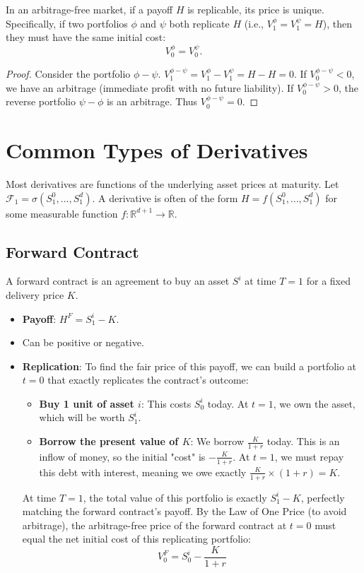 \begin{proposition}
In an arbitrage-free market, if a payoff $H$ is replicable, its price is unique. Specifically, if two portfolios $\phi$ and $\psi$ both replicate $H$ (i.e., $V_1^\phi = V_1^\psi = H$), then they must have the same initial cost:
\begin{equation}
    V_0^\phi = V_0^\psi.
\end{equation}
\end{proposition}
\begin{proof}
Consider the portfolio $\phi - \psi$.
$V_1^{\phi-\psi} = V_1^\phi - V_1^\psi = H - H = 0$.
If $V_0^{\phi-\psi} < 0$, we have an arbitrage (immediate profit with no future liability).
If $V_0^{\phi-\psi} > 0$, the reverse portfolio $\psi - \phi$ is an arbitrage.
Thus $V_0^{\phi-\psi} = 0$.
\end{proof}

\section{Common Types of Derivatives}

Most derivatives are functions of the underlying asset prices at maturity. Let $\mathcal{F}_1 = \sigma(S_1^0, \dots, S_1^d)$.
A derivative is often of the form $H = f(S_1^0, \dots, S_1^d)$ for some measurable function $f: \mathbb{R}^{d+1} \to \mathbb{R}$.

\subsection{Forward Contract}
A forward contract is an agreement to buy an asset $S^i$ at time $T=1$ for a fixed delivery price $K$.
\begin{itemize}
    \item \textbf{Payoff}: $H^F = S_1^i - K$.
    \item Can be positive or negative.
    \item \textbf{Replication}: To find the fair price of this payoff, we can build a portfolio at $t=0$ that exactly replicates the contract's outcome:
    \begin{itemize}
        \item \textbf{Buy 1 unit of asset $i$}: This costs $S_0^i$ today. At $t=1$, we own the asset, which will be worth $S_1^i$.
        \item \textbf{Borrow the present value of $K$}: We borrow $\frac{K}{1+r}$ today. This is an inflow of money, so the initial "cost" is $-\frac{K}{1+r}$. At $t=1$, we must repay this debt with interest, meaning we owe exactly $\frac{K}{1+r} \times (1+r) = K$.
    \end{itemize}
    At time $T=1$, the total value of this portfolio is exactly $S_1^i - K$, perfectly matching the forward contract's payoff. 
    By the Law of One Price (to avoid arbitrage), the arbitrage-free price of the forward contract at $t=0$ must equal the net initial cost of this replicating portfolio:
    \begin{equation}
        V_0^F = S_0^i - \frac{K}{1+r}
    \end{equation}
\end{itemize}

